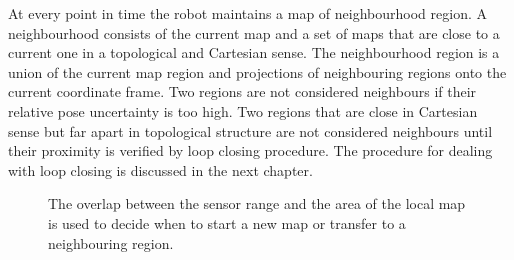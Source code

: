 At every point in time the robot maintains a map of neighbourhood
region. A neighbourhood consists of the current map and a set of maps
that are close to a current one in a topological and Cartesian sense.
The neighbourhood region is a union of the current map region and
projections of neighbouring regions onto the current coordinate frame.
Two regions are not considered neighbours if their relative pose
uncertainty is too high. Two regions that are close in Cartesian sense
but far apart in topological structure are not considered neighbours
until their proximity is verified by loop closing procedure. The
procedure for dealing with loop closing is discussed in the next
chapter.

\begin{figure}
\begin{center}
\quad \quad \quad
{}\quad
{}
\end{center}
\caption[Map regions used for triggering transition events]
{The overlap between the sensor range and the area of the local 
 map is used to decide when to start a new map or transfer to a 
 neighbouring region.}
\label{fig:StartNew}
\end{figure}

